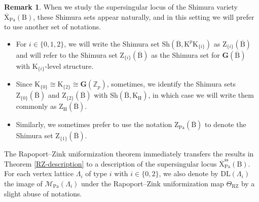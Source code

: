 \documentclass[10pt]{amsart}
\numberwithin{equation}{section}
\theoremstyle{definition}
\newtheorem{remark}[equation]{Remark}
\def\Pa{\mathrm{Pa}}
\def\calM{\mathcal{M}}
\def\bfG{\mathbf{G}}
\def\ZZ{\mathbb{Z}}
\def\rmB{\mathrm{B}}
\def\rmH{\mathrm{H}}
\def\rmK{\mathrm{K}}
\def\rmX{\mathrm{X}}
\def\rmZ{\mathrm{Z}}
\def\Sh{\mathrm{Sh}}
\begin{document}
\begin{remark}
When we study the supersingular locus of the Shimura variety $\overline{\rmX}_{\Pa}(\rmB)$, these Shimura sets appear naturally, and in this setting we will prefer to use another set of notations. 
\begin{itemize}

\item For $i\in\{0,1,2\}$, we will write the Shimura set $\Sh(\overline{\rmB}, \rmK^{p}\rmK_{\{i\}})$ as $\rmZ_{\{i\}}(\overline{\rmB})$
and will refer to the Shimura set $\rmZ_{\{i\}}(\overline{\rmB})$ as the Shimura set for $\bfG(\overline{\rmB})$ with $\rmK_{\{i\}}$-level structure. 

\item Since $\rmK_{\{0\}}\cong \rmK_{\{2\}}\cong \bfG(\ZZ_{p})$, sometimes,  we identify the Shimura sets $\rmZ_{\{0\}}(\overline{\rmB})$ and $\rmZ_{\{2\}}(\overline{\rmB})$ with $\Sh(\overline{\rmB}, \rmK_{\rmH})$, in which case we will write them commonly as  $\rmZ_{\rmH}(\overline{\rmB})$. 

\item Similarly, we sometimes prefer to use the notation $\rmZ_{\mathrm{Pa}}(\overline{\rmB})$ to denote the Shimura set  $\rmZ_{\{1\}}(\overline{\rmB})$.
\end{itemize}
\end{remark}


The Rapoport--Zink uniformization theorem immediately transfers the results in Theorem \ref{RZ-description} to a description of the supersingular locus $\overline{\rmX}^{\mathrm{ss}}_{\Pa}(\rmB)$. For each vertex lattice $\Lambda_{i}$ of type $i$ with $i\in\{0,2\}$, we also denote by $\mathrm{DL}(\Lambda_{i})$ the image of $\calM_{\Pa}(\Lambda_{i})$ under the Rapoport--Zink uniformization map $\Theta_{\mathrm{RZ}}$ by a slight abuse of notations. 
\end{document}
